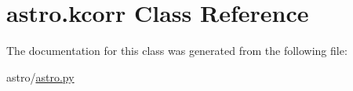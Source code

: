 \hypertarget{classastro_1_1kcorr}{}\section{astro.\+kcorr Class Reference}
\label{classastro_1_1kcorr}


The documentation for this class was generated from the following file\+:\begin{DoxyCompactItemize}
\item 
astro/\hyperlink{astro_8py}{astro.\+py}\end{DoxyCompactItemize}
